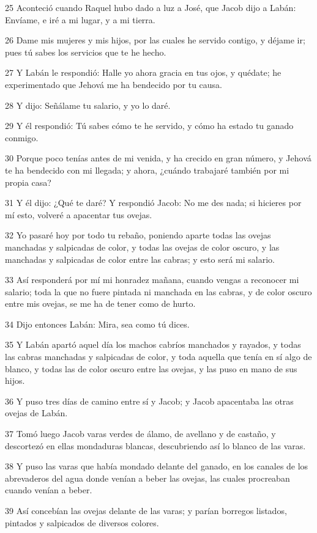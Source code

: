 \par 25 Aconteció cuando Raquel hubo dado a luz a José, que Jacob dijo a Labán: Envíame, e iré a mi lugar, y a mi tierra.
\par 26 Dame mis mujeres y mis hijos, por las cuales he servido contigo, y déjame ir; pues tú sabes los servicios que te he hecho.
\par 27 Y Labán le respondió: Halle yo ahora gracia en tus ojos, y quédate; he experimentado que Jehová me ha bendecido por tu causa.
\par 28 Y dijo: Señálame tu salario, y yo lo daré.
\par 29 Y él respondió: Tú sabes cómo te he servido, y cómo ha estado tu ganado conmigo.
\par 30 Porque poco tenías antes de mi venida, y ha crecido en gran número, y Jehová te ha bendecido con mi llegada; y ahora, ¿cuándo trabajaré también por mi propia casa?
\par 31 Y él dijo: ¿Qué te daré? Y respondió Jacob: No me des nada; si hicieres por mí esto, volveré a apacentar tus ovejas.
\par 32 Yo pasaré hoy por todo tu rebaño, poniendo aparte todas las ovejas manchadas y salpicadas de color, y todas las ovejas de color oscuro, y las manchadas y salpicadas de color entre las cabras; y esto será mi salario.
\par 33 Así responderá por mí mi honradez mañana, cuando vengas a reconocer mi salario; toda la que no fuere pintada ni manchada en las cabras, y de color oscuro entre mis ovejas, se me ha de tener como de hurto.
\par 34 Dijo entonces Labán: Mira, sea como tú dices.
\par 35 Y Labán apartó aquel día los machos cabríos manchados y rayados, y todas las cabras manchadas y salpicadas de color, y toda aquella que tenía en sí algo de blanco, y todas las de color oscuro entre las ovejas, y las puso en mano de sus hijos.
\par 36 Y puso tres días de camino entre sí y Jacob; y Jacob apacentaba las otras ovejas de Labán.
\par 37 Tomó luego Jacob varas verdes de álamo, de avellano y de castaño, y descortezó en ellas mondaduras blancas, descubriendo así lo blanco de las varas.
\par 38 Y puso las varas que había mondado delante del ganado, en los canales de los abrevaderos del agua donde venían a beber las ovejas, las cuales procreaban cuando venían a beber.
\par 39 Así concebían las ovejas delante de las varas; y parían borregos listados, pintados y salpicados de diversos colores.
